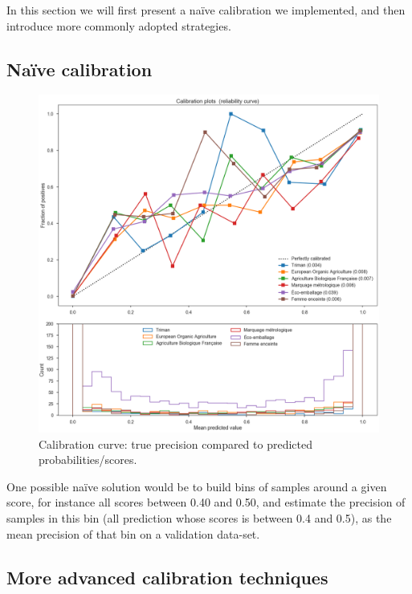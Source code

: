 In this section we will first present a naïve calibration we implemented, and then introduce more commonly adopted strategies.

\subsection{Naïve calibration}

\begin{figure}[H]
\centering
\includegraphics[scale=0.40]{./images/calibration/islabeledby_calibration_curve.png}
\caption{Calibration curve: true precision compared to predicted probabilities/scores.}
\end{figure}

One possible naïve solution would be to build bins of samples around a given score, for instance all scores between 0.40 and 0.50, and estimate the precision of samples in this bin (all prediction whose scores is between 0.4 and 0.5), as the mean precision of that bin on a validation data-set.

\subsection{More advanced calibration techniques}

